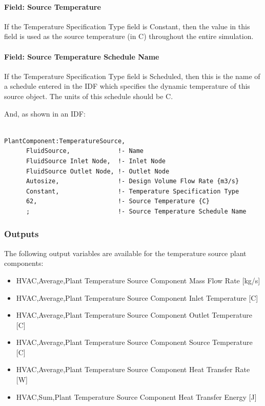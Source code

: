 \paragraph{Field: Source Temperature}\label{field-source-temperature}

If the Temperature Specification Type field is Constant, then the value in this field is used as the source temperature (in C) throughout the entire simulation.

\paragraph{Field: Source Temperature Schedule Name}\label{field-source-temperature-schedule-name}

If the Temperature Specification Type field is Scheduled, then this is the name of a schedule entered in the IDF which specifies the dynamic temperature of this source object. The units of this schedule should be C.

And, as shown in an IDF:

\begin{lstlisting}

PlantComponent:TemperatureSource,
      FluidSource,             !- Name
      FluidSource Inlet Node,  !- Inlet Node
      FluidSource Outlet Node, !- Outlet Node
      Autosize,                !- Design Volume Flow Rate {m3/s}
      Constant,                !- Temperature Specification Type
      62,                      !- Source Temperature {C}
      ;                        !- Source Temperature Schedule Name
\end{lstlisting}

\subsubsection{Outputs}\label{outputs-16-000}

The following output variables are available for the temperature source plant components:

\begin{itemize}
    \item
    HVAC,Average,Plant Temperature Source Component Mass Flow Rate {[}kg/s{]}
    \item
    HVAC,Average,Plant Temperature Source Component Inlet Temperature {[}C{]}
    \item
    HVAC,Average,Plant Temperature Source Component Outlet Temperature {[}C{]}
    \item
    HVAC,Average,Plant Temperature Source Component Source Temperature {[}C{]}
    \item
    HVAC,Average,Plant Temperature Source Component Heat Transfer Rate {[}W{]}
    \item
    HVAC,Sum,Plant Temperature Source Component Heat Transfer Energy {[}J{]}
\end{itemize}


